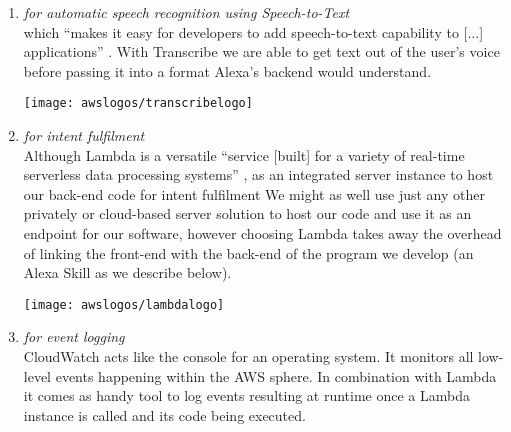 \begin{enumerate}
	
	\item[\href{https://aws.amazon.com/transcribe/}{\textbf{Transcribe}} \footnote{\url{https://aws.amazon.com/transcribe}}] \textit{for automatic speech recognition using Speech-to-Text}\\
	which ``makes it easy for developers to add speech-to-text capability to [...] applications'' \cite{aws_website}. With Transcribe we are able to get text out of the user's voice before passing it into a format Alexa's backend would understand.
	
	
	\begin{restoretext}
\begin{flushright}
	\texttt{[image: awslogos/transcribelogo]}
\end{flushright}
	\end{restoretext}
	

	\item[\href{https://aws.amazon.com/lambda/}{\textbf{Lambda}} \footnote{\url{https://aws.amazon.com/lambda}}] \textit{for intent fulfilment}\\
	Although Lambda is a versatile ``service [built] for a variety of real-time serverless data processing systems'' \cite{aws_website},  as an integrated server instance to host our back-end code for intent fulfilment%
	We might as well use just any other privately or cloud-based server solution to host our code and use it as an endpoint for our software, however choosing Lambda takes away the overhead of linking the front-end with the back-end of the program we develop (an Alexa Skill as we describe below). 
	
	
	\begin{restoretext}
\begin{flushright}
	\texttt{[image: awslogos/lambdalogo]}
\end{flushright}
	\end{restoretext}


	\item[\href{https://aws.amazon.com/iam/}{\textbf{CloudWatch}} \footnote{\url{https://aws.amazon.com/cloudwatch}}]
	\textit{for event logging}\\
	CloudWatch acts like the console for an operating system. It monitors all low-level events happening within the AWS sphere. In combination with Lambda it comes as handy tool to log events resulting at runtime once a Lambda instance is called and its code being executed.
	

\end{enumerate}
